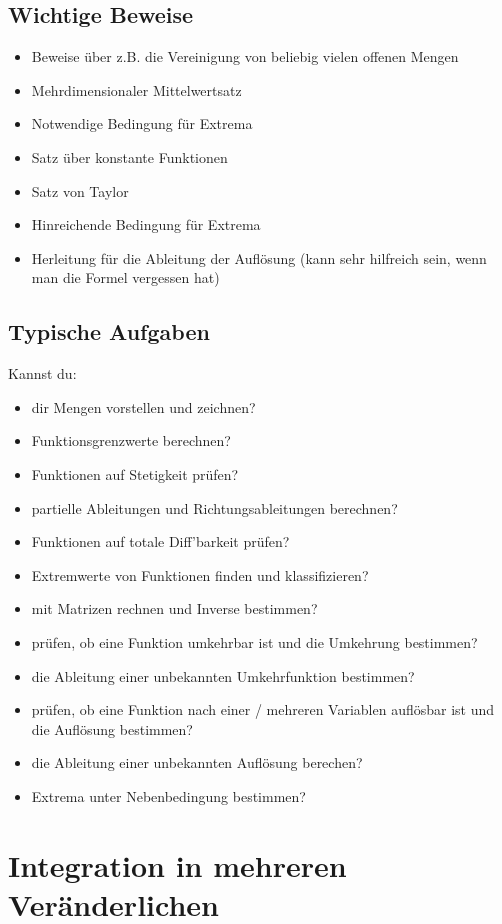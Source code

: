 \subsection{Wichtige Beweise}
\begin{itemize}
  \item Beweise über z.B. die Vereinigung von beliebig vielen offenen Mengen
  \item Mehrdimensionaler Mittelwertsatz
  \item Notwendige Bedingung für Extrema
  \item Satz über konstante Funktionen
  \item Satz von Taylor
  \item Hinreichende Bedingung für Extrema
  \item Herleitung für die Ableitung der Auflösung (kann sehr hilfreich sein,
        wenn man die Formel vergessen hat)
\end{itemize}

\subsection{Typische Aufgaben}
Kannst du:
\begin{itemize}
  \item dir Mengen vorstellen und zeichnen?
  \item Funktionsgrenzwerte berechnen?
  \item Funktionen auf Stetigkeit prüfen?
  \item partielle Ableitungen und Richtungsableitungen berechnen?
  \item Funktionen auf totale Diff'barkeit prüfen?
  \item Extremwerte von Funktionen finden und klassifizieren?
  \item mit Matrizen rechnen und Inverse bestimmen?
  \item prüfen, ob eine Funktion umkehrbar ist und die Umkehrung bestimmen?
  \item die Ableitung einer unbekannten Umkehrfunktion bestimmen?
  \item prüfen, ob eine Funktion nach einer / mehreren Variablen auflösbar ist und die Auflösung bestimmen?
  \item die Ableitung einer unbekannten Auflösung berechen?
  \item Extrema unter Nebenbedingung bestimmen?
\end{itemize}

\section{Integration in mehreren Veränderlichen}
